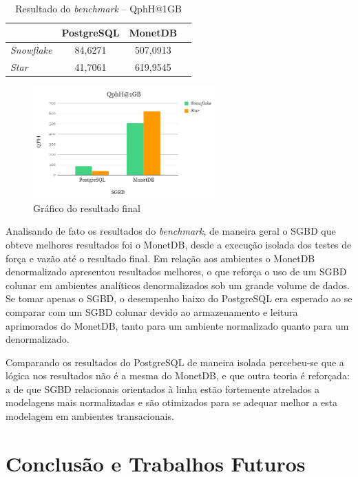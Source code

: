 \documentclass[conference]{IEEEtran}
\begin{document}
\begin{table}[htpb]
\centering
\caption{Resultado do \textit{benchmark} -- QphH@1GB}
\label{tab:resultado}
\begin{tabular}{@{}lccc@{}}
\toprule
          & PostgreSQL & MonetDB \\ \midrule
\textit{Snowflake} & 84,6271     & 507,0913   \\
\textit{Star}      & 41,7061        & 619,9545    \\ \bottomrule
\end{tabular}
\end{table}

\begin{figure}[htpb]
  \centering
  \includegraphics[width=7cm]{resultado_2}
  \caption{Gráfico do resultado final}
  \label{fig:resultado}
\end{figure}

Analisando de fato os resultados do \textit{benchmark}, de maneira geral o SGBD que obteve melhores resultados foi o MonetDB, desde a execução isolada dos testes de força e vazão até o resultado final. Em relação aos ambientes o MonetDB denormalizado apresentou resultados melhores, o que reforça o uso de um SGBD colunar em ambientes analíticos denormalizados sob um grande volume de dados. Se tomar apenas o SGBD, o desempenho baixo do PostgreSQL era esperado ao se comparar com um SGBD colunar devido ao armazenamento e leitura aprimorados do MonetDB, tanto para um ambiente normalizado quanto para um denormalizado. 

Comparando os resultados do PostgreSQL de maneira isolada percebeu-se que a lógica nos resultados não é a mesma do MonetDB, e que outra teoria é reforçada: a de que SGBD relacionais orientados à linha estão fortemente atrelados a modelagens mais normalizadas e são otimizados para se adequar melhor a esta modelagem em ambientes transacionais.


\section{Conclusão e Trabalhos Futuros}
\end{document}
